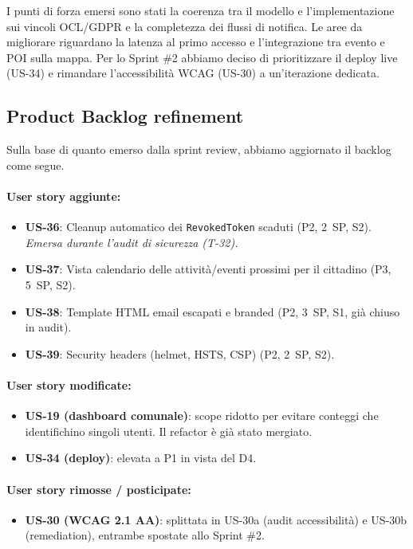 \documentclass[11pt,a4paper]{article}
\newcommand{\code}[1]{\texttt{\small#1}}
\begin{document}
  I punti di forza emersi sono stati la coerenza tra il modello e l'implementazione sui
  vincoli OCL/GDPR e la completezza dei flussi di notifica. Le aree da migliorare riguardano
  la latenza al primo accesso e l'integrazione tra evento e POI sulla mappa. Per lo Sprint
  \#2 abbiamo deciso di prioritizzare il deploy live (US-34) e rimandare l'accessibilit\`{a}
  WCAG (US-30) a un'iterazione dedicata.

  \subsection{Product Backlog refinement}
  Sulla base di quanto emerso dalla sprint review, abbiamo aggiornato il backlog come segue.

  \paragraph{User story aggiunte:}
  \begin{itemize}
    \item \textbf{US-36}: Cleanup automatico dei \code{RevokedToken} scaduti (P2, 2~SP, S2).
    \emph{Emersa durante l'audit di sicurezza (T-32).}
    \item \textbf{US-37}: Vista calendario delle attivit\`{a}/eventi prossimi per il cittadino
    (P3, 5~SP, S2).
    \item \textbf{US-38}: Template HTML email escapati e branded (P2, 3~SP, S1, gi\`{a} chiuso
    in audit).
    \item \textbf{US-39}: Security headers (helmet, HSTS, CSP) (P2, 2~SP, S2).
  \end{itemize}

  \paragraph{User story modificate:}
  \begin{itemize}
    \item \textbf{US-19 (dashboard comunale)}: scope ridotto per evitare conteggi che
    identifichino singoli utenti. Il refactor \`{e} gi\`{a} stato mergiato.
    \item \textbf{US-34 (deploy)}: elevata a P1 in vista del D4.
  \end{itemize}

  \paragraph{User story rimosse / posticipate:}
  \begin{itemize}
    \item \textbf{US-30 (WCAG 2.1 AA)}: splittata in US-30a (audit accessibilit\`{a}) e
    US-30b (remediation), entrambe spostate allo Sprint \#2.
  \end{itemize}
\end{document}
